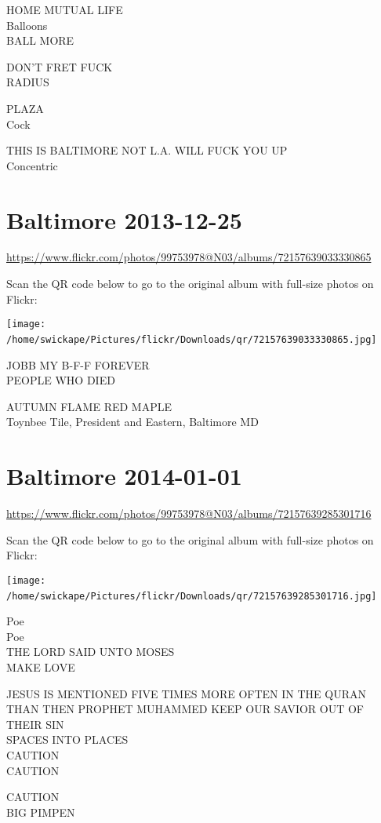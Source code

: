 \documentclass[10pt,letterpaper]{article}
\begin{document}
HOME MUTUAL LIFE\\
Balloons\\
BALL MORE

DON'T FRET FUCK\\
RADIUS

PLAZA\\
Cock

THIS IS BALTIMORE NOT L.A. WILL FUCK YOU UP\\
Concentric
\

\section*{Baltimore 2013-12-25}

\url{https://www.flickr.com/photos/99753978@N03/albums/72157639033330865}

Scan the QR code below to go to the original album with full-size photos on Flickr:

\texttt{[image: /home/swickape/Pictures/flickr/Downloads/qr/72157639033330865.jpg]}
\

JOBB MY B{-}F{-}F FOREVER\\
PEOPLE WHO DIED

AUTUMN FLAME RED MAPLE\\
Toynbee Tile, President and Eastern, Baltimore MD
\

\section*{Baltimore 2014-01-01}

\url{https://www.flickr.com/photos/99753978@N03/albums/72157639285301716}

Scan the QR code below to go to the original album with full-size photos on Flickr:

\texttt{[image: /home/swickape/Pictures/flickr/Downloads/qr/72157639285301716.jpg]}
\

Poe\\
Poe\\
THE LORD SAID UNTO MOSES\\
MAKE LOVE

JESUS IS MENTIONED FIVE TIMES MORE OFTEN IN THE QURAN THAN THEN PROPHET MUHAMMED KEEP OUR SAVIOR OUT OF THEIR SIN\\
SPACES INTO PLACES\\
CAUTION\\
CAUTION

CAUTION\\
BIG PIMPEN
\end{document}
